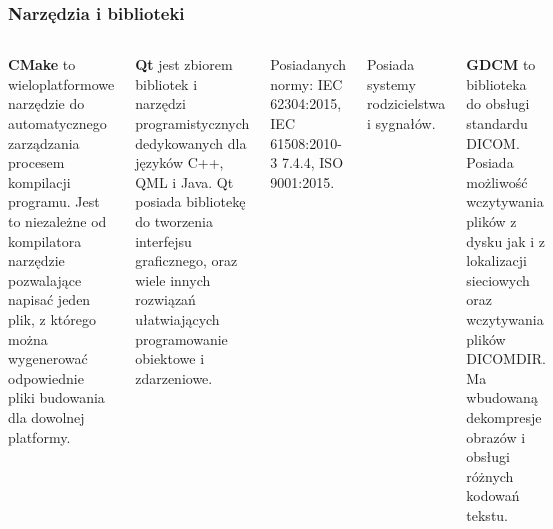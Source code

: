 \documentclass[aspectratio=169]{beamer}
\begin{document}
\begin{frame}[t]
    \frametitle{Narzędzia i biblioteki}

    \begin{columns}[t]
        \textbf{\LARGE CMake}
        \scriptsize
        to wieloplatformowe narzędzie do automatycznego zarządzania procesem kompilacji programu.
        Jest to niezależne od kompilatora narzędzie pozwalające napisać jeden plik, z którego można wygenerować odpowiednie pliki budowania dla dowolnej platformy.

        \textbf{\LARGE Qt}
        \scriptsize
        jest zbiorem bibliotek i narzędzi programistycznych dedykowanych dla języków C++, QML i Java.
        Qt posiada bibliotekę do tworzenia interfejsu graficznego, oraz wiele innych rozwiązań ułatwiających programowanie obiektowe i zdarzeniowe.

        Posiadanych normy: IEC 62304:2015, IEC 61508:2010-3 7.4.4, ISO 9001:2015.

        Posiada systemy rodzicielstwa i sygnałów.

        \textbf{\LARGE GDCM}
        \scriptsize
        to biblioteka do obsługi standardu DICOM.
        Posiada możliwość wczytywania plików z dysku jak i z lokalizacji sieciowych oraz wczytywania plików DICOMDIR.
        Ma wbudowaną dekompresje obrazów i obsługi różnych kodowań tekstu.

    \end{columns}






\end{frame}
\end{document}
